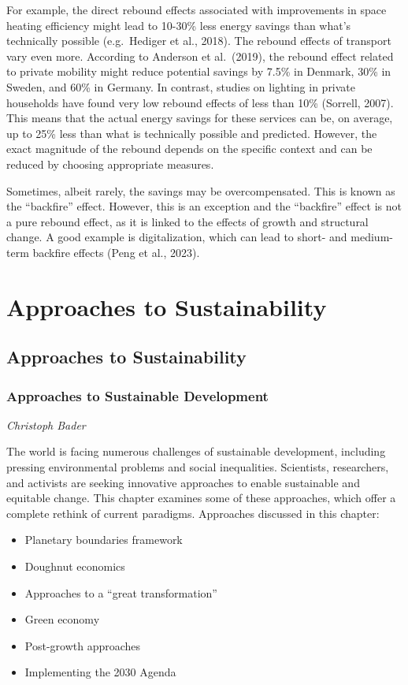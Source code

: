 \documentclass[
  a4paper,
  openany]{book}
\begin{document}
For example, the direct rebound effects associated with improvements in
space heating efficiency might lead to 10-30\% less energy savings than
what's technically possible (e.g.~Hediger et al., 2018). The rebound
effects of transport vary even more. According to Anderson et
al.~(2019), the rebound effect related to private mobility might reduce
potential savings by 7.5\% in Denmark, 30\% in Sweden, and 60\% in
Germany. In contrast, studies on lighting in private households have
found very low rebound effects of less than 10\% (Sorrell, 2007). This
means that the actual energy savings for these services can be, on
average, up to 25\% less than what is technically possible and
predicted. However, the exact magnitude of the rebound depends on the
specific context and can be reduced by choosing appropriate measures.

Sometimes, albeit rarely, the savings may be overcompensated. This is
known as the ``backfire'' effect. However, this is an exception and the
``backfire'' effect is not a pure rebound effect, as it is linked to the
effects of growth and structural change. A good example is
digitalization, which can lead to short- and medium-term backfire
effects (Peng et al., 2023).

\part{Approaches to Sustainability}

\chapter{Approaches to
Sustainability}\label{approaches-to-sustainability-1}

\section{Approaches to Sustainable
Development}\label{approaches-to-sustainable-development}

\emph{Christoph Bader}

The world is facing numerous challenges of sustainable development,
including pressing environmental problems and social inequalities.
Scientists, researchers, and activists are seeking innovative approaches
to enable sustainable and equitable change. This chapter examines some
of these approaches, which offer a complete rethink of current
paradigms. Approaches discussed in this chapter:

\begin{itemize}
\item
  Planetary boundaries framework
\item
  Doughnut economics
\item
  Approaches to a ``great transformation''
\item
  Green economy
\item
  Post-growth approaches
\item
  Implementing the 2030 Agenda
\end{itemize}
\end{document}

